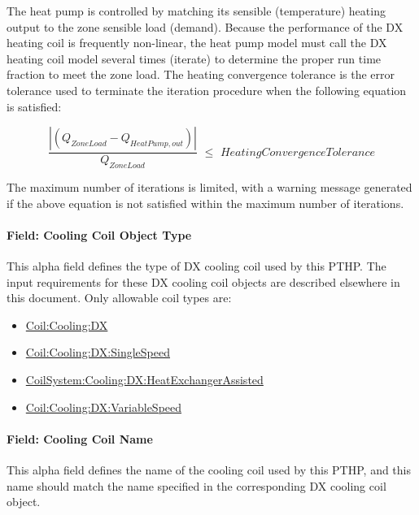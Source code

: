 The heat pump is controlled by matching its sensible (temperature) heating output to the zone sensible load (demand). Because the performance of the DX heating coil is frequently non-linear, the heat pump model must call the DX heating coil model several times (iterate) to determine the proper run time fraction to meet the zone load. The heating convergence tolerance is the error tolerance used to terminate the iteration procedure when the following equation is satisfied:

\begin{equation}
\frac{{\left| {({Q_{ZoneLoad}} - {Q_{HeatPump,out}})} \right|}}{{{Q_{ZoneLoad}}}}\,\, \le \,\,Heating Convergence Tolerance
\end{equation}

The maximum number of iterations is limited, with a warning message generated if the above equation is not satisfied within the maximum number of iterations.

\paragraph{Field: Cooling Coil Object Type}\label{field-cooling-coil-object-type-4-000}

This alpha field defines the type of DX cooling coil used by this PTHP. The input requirements for these DX cooling coil objects are described elsewhere in this document. Only allowable coil types are:

\begin{itemize}
\item
  \hyperref[coilcoolingdx]{Coil:Cooling:DX}
\item
  \hyperref[coilcoolingdxsinglespeed]{Coil:Cooling:DX:SingleSpeed}
\item
  \hyperref[coilsystemcoolingdxheatexchangerassisted]{CoilSystem:Cooling:DX:HeatExchangerAssisted}
\item
  \hyperref[coilcoolingdxvariablespeed]{Coil:Cooling:DX:VariableSpeed}
\end{itemize}

\paragraph{Field: Cooling Coil Name}\label{field-cooling-coil-name-3-000}

This alpha field defines the name of the cooling coil used by this PTHP, and this name should match the name specified in the corresponding DX cooling coil object.

